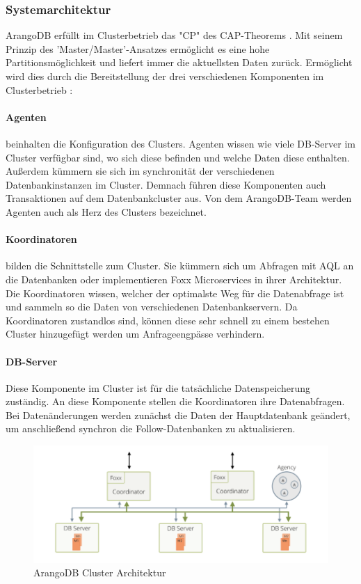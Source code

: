 \subsubsection{Systemarchitektur}
ArangoDB erfüllt im Clusterbetrieb das "CP" des CAP-Theorems \cite{CAP}. Mit seinem Prinzip des 'Master/Master'-Ansatzes ermöglicht es eine hohe Partitionsmöglichkeit und liefert immer die aktuellsten Daten zurück. Ermöglicht wird dies durch die Bereitstellung der drei verschiedenen Komponenten im Clusterbetrieb \cite{ADB_clusterarch}:
\paragraph{Agenten} 
beinhalten die Konfiguration des Clusters. Agenten wissen wie viele DB-Server im Cluster verfügbar sind, wo sich diese befinden und welche Daten diese enthalten. Außerdem kümmern sie sich im synchronität der verschiedenen Datenbankinstanzen im Cluster. Demnach führen diese Komponenten auch Transaktionen auf dem Datenbankcluster aus. Von dem ArangoDB-Team werden Agenten auch als Herz des Clusters bezeichnet. \cite{ADB_clusterarch}
\paragraph{Koordinatoren} bilden die Schnittstelle zum Cluster. Sie kümmern sich um Abfragen mit \ac{AQL} an die Datenbanken oder implementieren Foxx Microservices in ihrer Architektur. Die Koordinatoren wissen, welcher der optimalste Weg für die Datenabfrage ist und sammeln so die Daten von verschiedenen Datenbankservern. Da Koordinatoren zustandlos sind, können diese sehr schnell zu einem bestehen Cluster hinzugefügt werden um Anfrageengpässe verhindern. \cite{ADB_clusterarch}
\paragraph{DB-Server} 
Diese Komponente im Cluster ist für die tatsächliche Datenspeicherung zuständig. An diese Komponente stellen die Koordinatoren ihre Datenabfragen. Bei Datenänderungen werden zunächst die Daten der Hauptdatenbank geändert, um anschließend synchron die Follow-Datenbanken zu aktualisieren.

\begin{figure}[htbp] 
  	\centering
     \includegraphics[width=1\textwidth]{./images/cluster-arch.png}
 	\caption{ArangoDB Cluster Architektur \cite{ADB_clusterarch}}
  \label{fig:ClusterArch}
\end{figure}



